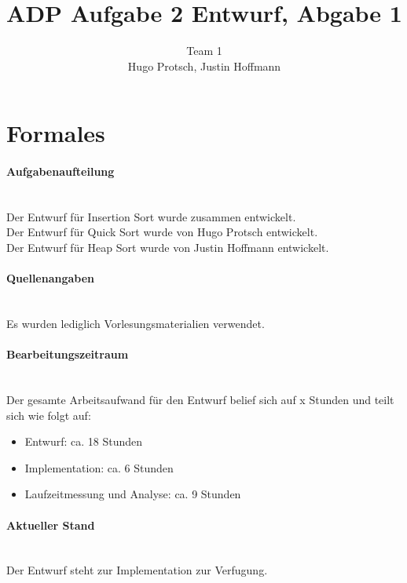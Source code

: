 \documentclass[11pt]{article}
\title{ADP Aufgabe 2 Entwurf, Abgabe 1}
\author{Team 1\\Hugo Protsch, Justin Hoffmann}
\begin{document}
    \maketitle

    \tableofcontents

    \newpage


    \section{Formales}\label{sec:Formales}

    \paragraph*{Aufgabenaufteilung}\mbox{}\\
    Der Entwurf für Insertion Sort wurde zusammen entwickelt.\\
    Der Entwurf für Quick Sort wurde von Hugo Protsch entwickelt.\\
    Der Entwurf für Heap Sort wurde von Justin Hoffmann entwickelt.

    \paragraph*{Quellenangaben}\mbox{}\\
    Es wurden lediglich Vorlesungsmaterialien verwendet.

    \paragraph*{Bearbeitungszeitraum}\mbox{}\\
    Der gesamte Arbeitsaufwand für den Entwurf belief sich auf x Stunden%
    und teilt sich wie folgt auf:
    \begin{itemize}
        \setlength\itemsep{0em}
        \item Entwurf: ca. 18 Stunden
        \item Implementation: ca. 6 Stunden %
        \item Laufzeitmessung und Analyse: ca. 9 Stunden
    \end{itemize}

    \paragraph*{Aktueller Stand}\mbox{}\\
    Der Entwurf steht zur Implementation zur Verfugung.
\end{document}
